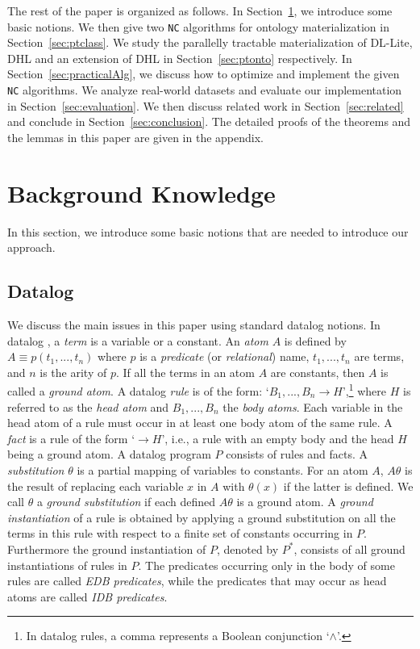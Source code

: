 \documentclass[final,1p,times]{elsarticle}
\begin{document}
The rest of the paper is organized as follows. In Section~\ref{sec:background}, we introduce some basic notions.
We then give two \texttt{NC} algorithms for ontology materialization in Section~\ref{sec:ptclass}.
We study the parallelly tractable materialization of DL-Lite, DHL and an extension of DHL in Section~\ref{sec:ptonto} respectively.
In Section~\ref{sec:practicalAlg},
we discuss how to optimize and implement the given \texttt{NC} algorithms.
We analyze real-world datasets and evaluate our implementation in Section~\ref{sec:evaluation}.
We then discuss related work in Section~\ref{sec:related} and conclude in Section~\ref{sec:conclusion}.
The detailed proofs of the theorems and the lemmas in this paper are given in the appendix.


\section{Background Knowledge}
\label{sec:background}

In this section, we introduce some basic notions that are needed to introduce our approach.

\subsection{Datalog}

We discuss the main issues in this paper using standard datalog notions.
In datalog \cite{database}, a \emph{term} is a variable or a constant. An \emph{atom} $A$
is defined by $A\equiv p(t_1,...,t_n)$ where $p$ is a \emph{predicate} (or \emph{relational})
name, $t_1,...,t_n$ are terms, and $n$ is the arity of $p$. If all the terms in an atom $A$ are
constants, then $A$ is called a \emph{ground atom}.
A datalog \emph{rule} is of the form: `$B_1,...,B_n\rightarrow H$',\footnote{In datalog rules, a comma
represents a Boolean conjunction `$\wedge$'.} where $H$ is referred to as
the \emph{head atom} and $B_1,...,B_n$ the \emph{body atoms}. Each variable in the head atom
of a rule must occur in at least one body atom of the same rule. A \emph{fact} is a rule of
the form `$\rightarrow H$', i.e., a rule with an empty body and the head $H$ being a ground atom.
A datalog program $P$ consists of rules and facts.
A \emph{substitution} $\theta$ is a partial mapping of variables to constants.
For an atom $A$, $A\theta$ is the result of replacing each variable $x$ in $A$
with $\theta(x)$ if the latter is defined. We call $\theta$ a \emph{ground substitution}
if each defined $A\theta$ is a ground atom.
A \emph{ground instantiation} of a rule is obtained by applying a ground substitution on all
the terms in this rule with respect to a finite set of constants occurring in $P$.
Furthermore the ground instantiation of $P$, denoted by $P^*$,
consists of all ground instantiations of rules in $P$.
The predicates occurring only in the body  of some rules are called \emph{EDB predicates},
while the predicates that may occur as head atoms are called \emph{IDB predicates}.
\end{document}
